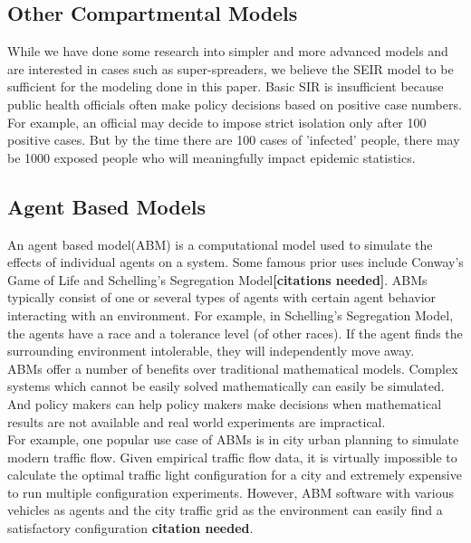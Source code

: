 \documentclass[12pt, a4, epsf] {article}
\theoremstyle{plain}
\theoremstyle{definition}
\begin{document}
\subsection{Other Compartmental Models}
While we have done some research into simpler and more advanced models and are interested in cases such as super-spreaders, we believe the SEIR model to be sufficient for the modeling done in this paper. Basic SIR is insufficient because public health officials often make policy decisions based on positive case numbers. For example, an official may decide to impose strict isolation only after 100 positive cases. But by the time there are 100 cases of 'infected' people, there may be 1000 exposed people who will meaningfully impact epidemic statistics.
\subsection{Agent Based Models}
An agent based model(ABM) is a computational model used to simulate the effects of individual agents on a system. Some famous prior uses include Conway's Game of Life and Schelling's Segregation Model\textbf{[citations needed]}. ABMs typically consist of one or several types of agents with certain agent behavior interacting with an environment. For example, in Schelling's Segregation Model, the agents have a race and a tolerance level (of other races). If the agent finds the surrounding environment intolerable, they will independently move away.\\
ABMs offer a number of benefits over traditional mathematical models. Complex systems which cannot be easily solved mathematically can easily be simulated. And policy makers can help policy makers make decisions when mathematical results are not available and real world experiments are impractical. \\
For example, one popular use case of ABMs is in city urban planning to simulate modern traffic flow. Given empirical traffic flow data, it is virtually impossible to calculate the optimal traffic light configuration for a city and extremely expensive to run multiple configuration experiments. However, ABM software with various vehicles as agents and the city traffic grid as the environment can easily find a satisfactory configuration \textbf{citation needed}.
\end{document}
